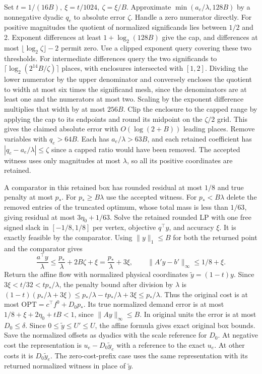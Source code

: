 \documentclass[11pt]{article}
\begin{document}
Set \(t=1/(16B),\ \xi=t/1024,\ \zeta=\xi/B\). Approximate \(\min(a_e/\lambda,128B)\) by a nonnegative dyadic \(q_e\) to absolute error \(\zeta\). Handle a zero numerator directly. For positive magnitudes the quotient of normalized significands lies between \(1/2\) and 2. Exponent differences at least \(1+\log_2(128B)\) give the cap, and differences at most \(\lfloor\log_2\zeta\rfloor-2\) permit zero. Use a clipped exponent query covering these two thresholds. For intermediate differences query the two significands to \(\lceil\log_2(2^{14}B/\zeta)\rceil\) places, with enclosures intersected with \([1,2]\). Dividing the lower numerator by the upper denominator and conversely encloses the quotient to width at most six times the significand mesh, since the denominators are at least one and the numerators at most two. Scaling by the exponent difference multiplies that width by at most \(256B\). Clip the enclosure to the capped range by applying the cap to its endpoints and round its midpoint on the \(\zeta/2\) grid. This gives the claimed absolute error with \(O(\log(2+B))\) leading places. Remove variables with \(q_e>64B\). Each has \(a_e/\lambda>63B\), and each retained coefficient has \(|q_e-a_e/\lambda|\le\zeta\) since a capped ratio would have been removed. The accepted witness uses only magnitudes at most \(\lambda\), so all its positive coordinates are retained.

A comparator in this retained box has rounded residual at most \(1/8\) and true penalty at most \(p_*\). For \(p_*\ge B\lambda\) use the accepted witness. For \(p_*< B\lambda\) delete the removed entries of the truncated optimum, whose total mass is less than \(1/63\), giving residual at most \(3\eta_0+1/63\). Solve the retained rounded LP with one free signed slack in \([-1/8,1/8]\) per vertex, objective \(q^\top y\), and accuracy \(\xi\). It is exactly feasible by the comparator. Using \(\|y\|_1\le B\) for both the returned point and the comparator gives
\[
 \frac{a^\top y}{\lambda}\le\frac{p_*}{\lambda}+2B\zeta+\xi
                     =\frac{p_*}{\lambda}+3\xi,\qquad
 \|A'y-b'\|_\infty\le1/8+\xi .
\]
Return the affine flow with normalized physical coordinates \(\tilde y=(1-t)y\). Since \(3\xi<t/32<t p_*/\lambda\), the penalty bound after division by \(\lambda\) is \((1-t)(p_*/\lambda+3\xi)\le p_*/\lambda-tp_*/\lambda+3\xi\le p_*/\lambda\). Thus the original cost is at most \(\mathrm{OPT}=c^\top f^0+D_0p_*\). Its true normalized demand error is at most \(1/8+\xi+2\eta_0+tB<1\), since \(\|Ay\|_\infty\le B\). In original units the error is at most \(D_0\le\delta\). Since \(0\le\tilde y\le U'\le U\), the affine formula gives exact original box bounds. Save the normalized offsets as dyadics with the scale reference for \(D_0\). At negative cost the representation is \(u_e-D_0\tilde y_e\) with a reference to the exact \(u_e\). At other costs it is \(D_0\tilde y_e\). The zero-cost-prefix case uses the same representation with its returned normalized witness in place of \(\tilde y\).
\end{document}
